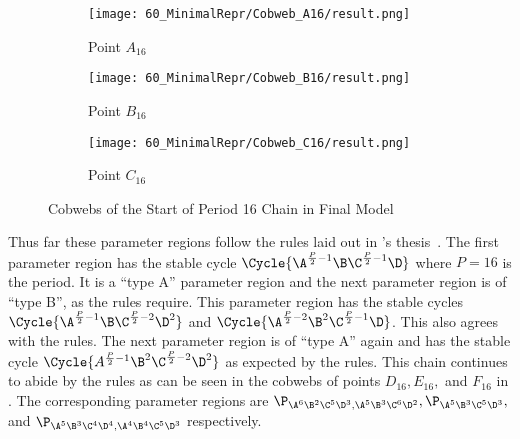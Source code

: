 \begin{figure}
    \centering
    \begin{subfigure}{0.3\textwidth}
        \centering
        \texttt{[image: 60\_MinimalRepr/Cobweb\_A16/result.png]}
        \caption{Point $A_{16}$}
        \label{fig:final.cob.A16}
    \end{subfigure}
    \begin{subfigure}{0.3\textwidth}
        \centering
        \texttt{[image: 60\_MinimalRepr/Cobweb\_B16/result.png]}
        \caption{Point $B_{16}$}
        \label{fig:final.cob.B16}
    \end{subfigure}
    \begin{subfigure}{0.3\textwidth}
        \centering
        \texttt{[image: 60\_MinimalRepr/Cobweb\_C16/result.png]}
        \caption{Point $C_{16}$}
        \label{fig:final.cob.C16}
    \end{subfigure}
    \caption{Cobwebs of the Start of Period 16 Chain in Final Model}
    \label{fig:final.cob.start16}
\end{figure}

Thus far these parameter regions follow the rules laid out in 's thesis~\Cite{akyuz2022}.
The first parameter region has the stable cycle $\Cycle{\A^{\frac{P}{2} - 1}\B\C^{\frac{P}{2} - 1}\D}$ where $P = 16$ is the period.
It is a ``type A'' parameter region and the next parameter region is of ``type B'', as the rules require.
This parameter region has the stable cycles $\Cycle{\A^{\frac{P}{2} - 1}\B\C^{\frac{P}{2} - 2}\D^2}$ and $\Cycle{\A^{\frac{P}{2} - 2}\B^2\C^{\frac{P}{2} - 1}\D}$.
This also agrees with the rules.
The next parameter region is of ``type A'' again and has the stable cycle $\Cycle{A^{\frac{P}{2} - 1}\B^2\C^{\frac{P}{2} - 2}\D^2}$ as expected by the rules.
This chain continues to abide by the rules as can be seen in the cobwebs of points $D_{16}, E_{16},$ and $F_{16}$ in .
The corresponding parameter regions are $\P_{\A^6\B^2\C^5\D^3, \A^5\B^3\C^6\D^2}, \P_{\A^5\B^3\C^5\D^3},$ and $\P_{\A^5\B^3\C^4\D^4, \A^4\B^4\C^5\D^3}$ respectively.

